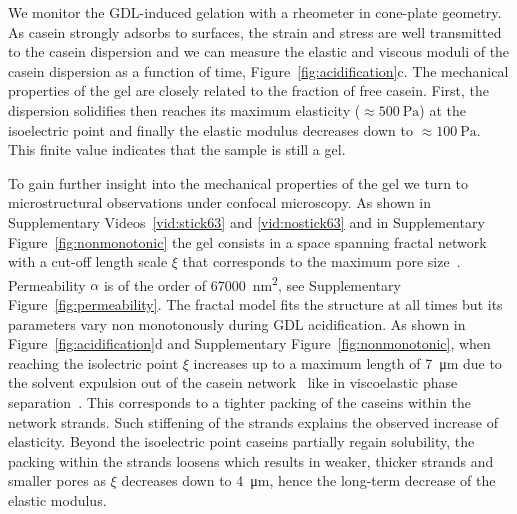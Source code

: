 \documentclass[twocolumn,superscriptaddress,showpacs,preprintnumbers,
amsmath,amssymb,prl]{revtex4-1}
\begin{document}
We monitor the GDL-induced gelation with a rheometer in cone-plate geometry. As casein strongly adsorbs to surfaces, the strain and stress are well transmitted to the casein dispersion and we can measure the elastic and viscous moduli of the casein dispersion as a function of time, Figure~\ref{fig:acidification}c. The mechanical properties of the gel are closely related to the fraction of free casein. First, the dispersion solidifies then reaches its maximum elasticity ($\approx\SI{500}{\pascal}$) at the isoelectric point and finally the elastic modulus decreases down to $\approx\SI{100}{\pascal}$. This finite value indicates that the sample is still a gel.

To gain further insight into the mechanical properties of the gel we turn to microstructural observations under confocal microscopy. As shown in Supplementary Videos~\ref{vid:stick63} and \ref{vid:nostick63} and in Supplementary Figure~\ref{fig:nonmonotonic} the gel consists in a space spanning fractal network with a cut-off length scale $\xi$ that corresponds to the maximum pore size~\cite{VanDijk1986}. Permeability $\alpha$ is of the order of \SI{67000}{\square\nano\metre}, see Supplementary Figure~\ref{fig:permeability}. The fractal model fits the structure at all times but its parameters vary non monotonously during GDL acidification. As shown in Figure~\ref{fig:acidification}d and Supplementary Figure~\ref{fig:nonmonotonic}, when reaching the isolectric point $\xi$ increases up to a maximum length of \SI{7}{\micro\metre} due to the solvent expulsion out of the casein network~\cite{Lucey1998} like in viscoelastic phase separation~\cite{Tanaka2000h}. This corresponds to a tighter packing of the caseins within the network strands. Such stiffening of the strands explains the observed increase of elasticity. Beyond the isoelectric point caseins partially regain solubility, the packing within the strands loosens which results in weaker, thicker strands and smaller pores as $\xi$ decreases down to \SI{4}{\micro\metre}, hence the long-term decrease of the elastic modulus.

\end{document}

